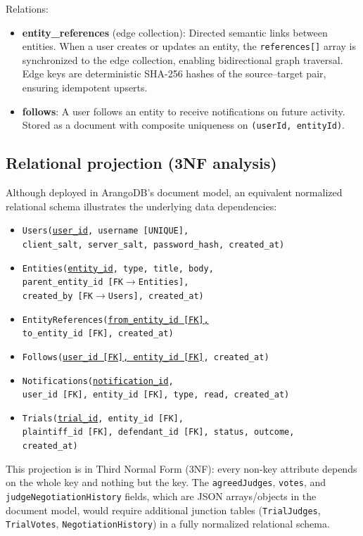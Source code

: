 \documentclass[13pt,a4paper]{report}
\begin{document}
Relations:
\begin{itemize}
    \item \textbf{entity\_references} (edge collection): Directed semantic links between entities. When a user creates or updates an entity, the \texttt{references[]} array is synchronized to the edge collection, enabling bidirectional graph traversal. Edge keys are deterministic SHA-256 hashes of the source--target pair, ensuring idempotent upserts.
    \item \textbf{follows}: A user follows an entity to receive notifications on future activity. Stored as a document with composite uniqueness on \texttt{(userId, entityId)}.
\end{itemize}

\subsection{Relational projection (3NF analysis)}
Although deployed in ArangoDB's document model, an equivalent normalized relational schema illustrates the underlying data dependencies:
{\footnotesize
\begin{itemize}
    \item \texttt{Users(\underline{user\_id}, username [UNIQUE],} \\
      \texttt{client\_salt, server\_salt, password\_hash, created\_at)}
    \item \texttt{Entities(\underline{entity\_id}, type, title, body,} \\
      \texttt{parent\_entity\_id [FK$\to$Entities],} \\
      \texttt{created\_by [FK$\to$Users], created\_at)}
    \item \texttt{EntityReferences(\underline{from\_entity\_id [FK],} \\
      \texttt{to\_entity\_id [FK]}, created\_at)}
    \item \texttt{Follows(\underline{user\_id [FK],
      entity\_id [FK]}, created\_at)}
    \item \texttt{Notifications(\underline{notification\_id},} \\
      \texttt{user\_id [FK], entity\_id [FK], type, read, created\_at)}
    \item \texttt{Trials(\underline{trial\_id}, entity\_id [FK],} \\
      \texttt{plaintiff\_id [FK], defendant\_id [FK], status, outcome,} \\
      \texttt{created\_at)}
\end{itemize}
}
This projection is in Third Normal Form (3NF): every non-key attribute depends on the whole key and nothing but the key. The \texttt{agreedJudges}, \texttt{votes}, and \texttt{judgeNegotiationHistory} fields, which are JSON arrays/objects in the document model, would require additional junction tables (\texttt{TrialJudges}, \texttt{TrialVotes}, \texttt{NegotiationHistory}) in a fully normalized relational schema.
\end{document}
